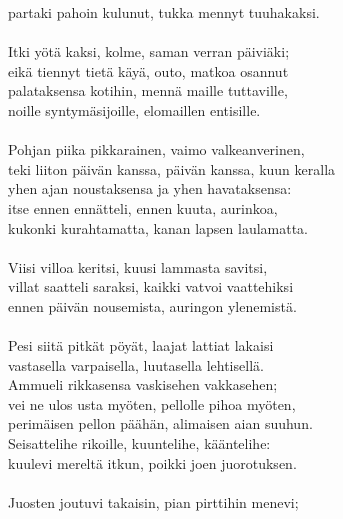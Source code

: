 partaki pahoin kulunut, tukka mennyt tuuhakaksi.          \\
                                                          \\
Itki yötä kaksi, kolme, saman verran päiviäki;            \\
eikä tiennyt tietä käyä, outo, matkoa osannut             \\
palataksensa kotihin, mennä maille tuttaville,            \\
noille syntymäsijoille, elomaillen entisille.             \\
                                                          \\
Pohjan piika pikkarainen, vaimo valkeanverinen,           \\
teki liiton päivän kanssa, päivän kanssa, kuun keralla    \\
yhen ajan noustaksensa ja yhen havataksensa:              \\
itse ennen ennätteli, ennen kuuta, aurinkoa,              \\
kukonki kurahtamatta, kanan lapsen laulamatta.            \\
                                                          \\
Viisi villoa keritsi, kuusi lammasta savitsi,             \\
villat saatteli saraksi, kaikki vatvoi vaattehiksi        \\
ennen päivän nousemista, auringon ylenemistä.             \\
                                                          \\
Pesi siitä pitkät pöyät, laajat lattiat lakaisi           \\
vastasella varpaisella, luutasella lehtisellä.            \\
Ammueli rikkasensa vaskisehen vakkasehen;                 \\
vei ne ulos usta myöten, pellolle pihoa myöten,           \\
perimäisen pellon päähän, alimaisen aian suuhun.          \\
Seisattelihe rikoille, kuuntelihe, kääntelihe:            \\
kuulevi mereltä itkun, poikki joen juorotuksen.           \\
                                                          \\
Juosten joutuvi takaisin, pian pirttihin menevi;          \\
